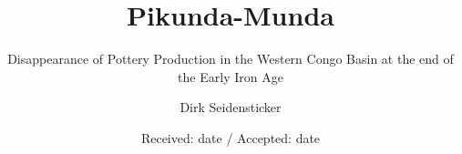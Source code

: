 \documentclass[smallextended,natbib]{svjour3}       %
\begin{document}
	
\title{Pikunda-Munda}
\subtitle{Disappearance of Pottery Production in the Western Congo Basin at the end of the Early Iron Age}

\author{Dirk Seidensticker}


\date{Received: date / Accepted: date}

\maketitle
\end{document}

